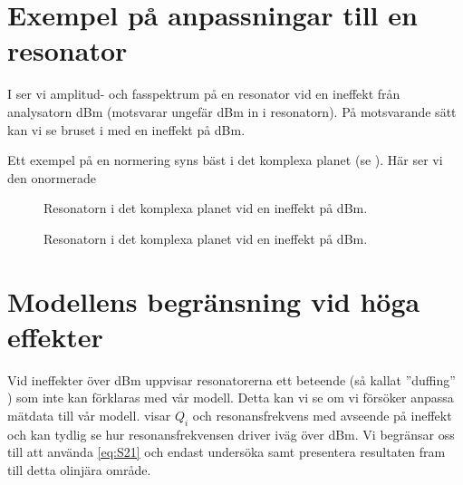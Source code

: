 \documentclass[main.tex]{subfiles}
\begin{document}
\section{Exempel på anpassningar till en resonator}

I  ser vi amplitud- och fasspektrum på en resonator vid en ineffekt från analysatorn \unit[-40]{dBm} (motsvarar ungefär \unit[-107]{dBm} in i resonatorn). På motsvarande sätt kan vi se bruset i  med en ineffekt på \unit[-90]{dBm}.

Ett exempel på en normering syns bäst i det komplexa planet (se ). Här ser vi den onormerade 


\begin{figure}[H]
    \begin{subfigure}[t]{0.5\textwidth}
        \centerfloat
        \setlength{}
        \setlength\figureheight{20em}
        
    \end{subfigure}
    \begin{subfigure}[t]{0.5\textwidth}
        \centerfloat
        \setlength{}
        \setlength\figureheight{20em}
        
    \end{subfigure}
    \caption{Resonatorn i det komplexa planet vid en ineffekt på \unit[-80]{dBm}.}
    \label{fig:ex_magphs_resonator}
\end{figure}

\begin{figure}[H]
    \begin{subfigure}[t]{0.6\textwidth}
        \centerfloat
        \setlength{}
        \setlength\figureheight{13em}
        
    \end{subfigure}
    \begin{subfigure}[t]{0.6\textwidth}
        \centerfloat
        \setlength{}
        \setlength\figureheight{13em}
        
    \end{subfigure}
    \caption{Resonatorn i det komplexa planet vid en ineffekt på \unit[-80]{dBm}.}
    \label{fig:ex_cmplx_resonator}
\end{figure}

\section{Modellens begränsning vid höga effekter}
Vid ineffekter över \unit[-70]{dBm} uppvisar resonatorerna ett beteende (så kallat ''duffing'' \cite{tholen2007}) som inte kan förklaras med vår modell. Detta kan vi se om vi försöker anpassa mätdata till vår modell.  visar $Q_i$ och resonansfrekvens med avseende på ineffekt och kan tydlig se hur resonansfrekvensen driver iväg över \unit[-70]{dBm}. Vi begränsar oss till att använda \ref{eq:S21} och endast undersöka samt presentera resultaten fram till detta olinjära område.
\end{document}
